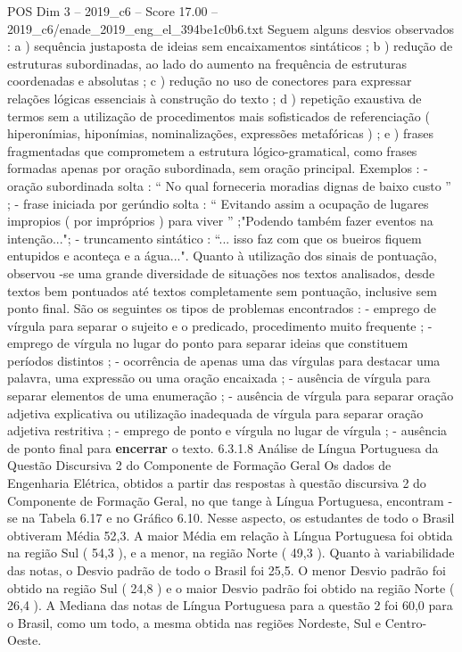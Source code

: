 \begin{textsample}{POS Dim 3 – 2019\_c6 – Score 17.00 – 2019\_c6/enade\_2019\_eng\_el\_394be1c0b6.txt}
Seguem alguns desvios observados : a ) sequência justaposta de ideias sem encaixamentos sintáticos ; b ) redução de estruturas subordinadas, ao lado do aumento na frequência de estruturas coordenadas e absolutas ; c ) redução no uso de conectores para expressar relações lógicas essenciais à construção do texto ; d ) repetição exaustiva de termos sem a utilização de procedimentos mais sofisticados de referenciação ( hiperonímias, hiponímias, nominalizações, expressões metafóricas ) ; e ) frases fragmentadas que comprometem a estrutura lógico-gramatical, como frases formadas apenas por oração subordinada, sem oração principal.
Exemplos : - oração subordinada solta : “ No qual forneceria moradias dignas de baixo custo ” ; - frase iniciada por gerúndio solta : “ Evitando assim a ocupação de lugares impropios ( por impróprios ) para viver ” ;"Podendo também fazer eventos na intenção..."; - truncamento sintático : “... isso faz com que os bueiros fiquem entupidos e aconteça e a água...".
Quanto à utilização dos sinais de pontuação, observou -se uma grande diversidade de situações nos textos analisados, desde textos bem pontuados até textos completamente sem pontuação, inclusive sem ponto final.
São os seguintes os tipos de problemas encontrados : - emprego de vírgula para separar o sujeito e o predicado, procedimento muito frequente ; - emprego de vírgula no lugar do ponto para separar ideias que constituem períodos distintos ; - ocorrência de apenas uma das vírgulas para destacar uma palavra, uma expressão ou uma oração encaixada ; - ausência de vírgula para separar elementos de uma enumeração ; - ausência de vírgula para separar oração adjetiva explicativa ou utilização inadequada de vírgula para separar oração adjetiva restritiva ; - emprego de ponto e vírgula no lugar de vírgula ; - ausência de ponto final para \textbf{encerrar} o texto. 6.3.1.8 Análise de Língua Portuguesa da Questão Discursiva 2 do Componente de Formação Geral Os dados de Engenharia Elétrica, obtidos a partir das respostas à questão discursiva 2 do Componente de Formação Geral, no que tange à Língua Portuguesa, encontram -se na Tabela 6.17 e no Gráfico 6.10.
Nesse aspecto, os estudantes de todo o Brasil obtiveram Média 52,3.
A maior Média em relação à Língua Portuguesa foi obtida na região Sul ( 54,3 ), e a menor, na região Norte ( 49,3 ).
Quanto à variabilidade das notas, o Desvio padrão de todo o Brasil foi 25,5.
O menor Desvio padrão foi obtido na região Sul ( 24,8 ) e o maior Desvio padrão foi obtido na região Norte ( 26,4 ).
A Mediana das notas de Língua Portuguesa para a questão 2 foi 60,0 para o Brasil, como um todo, a mesma obtida nas regiões Nordeste, Sul e Centro-Oeste.

\end{textsample}
